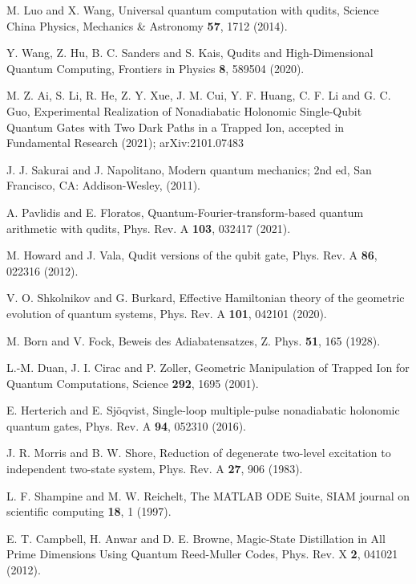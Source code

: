 {\begin{enumerate}[label={[\arabic*]}]
\item M. Luo and X. Wang, Universal quantum computation with qudits, Science China Physics, Mechanics \& Astronomy \textbf{57}, 1712 (2014).


\item Y. Wang, Z. Hu, B. C. Sanders and S. Kais, Qudits and High-Dimensional Quantum Computing, Frontiers in Physics \textbf{8}, 589504 (2020).

\item M. Z. Ai, S. Li, R. He, Z. Y. Xue, J. M. Cui, Y. F. Huang, C. F. Li and G. C. Guo, Experimental Realization of Nonadiabatic Holonomic Single-Qubit Quantum Gates with Two Dark Paths in
a Trapped Ion, accepted in Fundamental Research (2021); arXiv:2101.07483

\item J. J. Sakurai and J. Napolitano, Modern quantum mechanics; 2nd ed, San Francisco, CA: Addison-Wesley, (2011).

\item A. Pavlidis and E. Floratos, Quantum-Fourier-transform-based quantum arithmetic with qudits, Phys. Rev. A \textbf{103}, 032417 (2021).

\item M. Howard and J. Vala, Qudit versions of the qubit gate, Phys. Rev. A \textbf{86}, 022316 (2012).

\item V. O. Shkolnikov and G. Burkard, Effective Hamiltonian theory of the geometric evolution of quantum systems, Phys. Rev. A \textbf{101}, 042101 (2020).

\item M. Born and V. Fock, Beweis des Adiabatensatzes, Z. Phys. \textbf{51}, 165 (1928).

\item L.-M. Duan, J. I. Cirac and P. Zoller, Geometric Manipulation of Trapped Ion for Quantum Computations, Science \textbf{292}, 1695 (2001).

\item E. Herterich and E. Sjöqvist, Single-loop multiple-pulse nonadiabatic holonomic quantum gates, Phys. Rev. A \textbf{94}, 052310 (2016).

\item J. R. Morris and B. W. Shore, Reduction of degenerate two-level excitation to independent two-state system, Phys. Rev. A \textbf{27}, 906 (1983).

\item L. F. Shampine and M. W. Reichelt, The MATLAB ODE Suite, SIAM journal on scientific computing \textbf{18}, 1 (1997).

\item E. T. Campbell, H. Anwar and D. E. Browne, Magic-State Distillation in All Prime Dimensions Using Quantum Reed-Muller Codes, Phys. Rev. X \textbf{2}, 041021 (2012).

\end{enumerate}
}